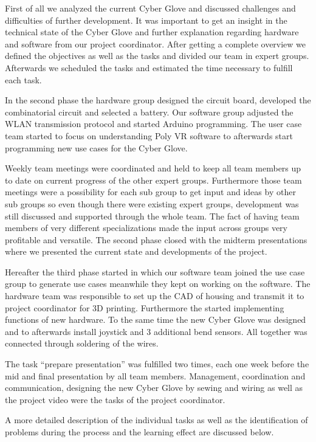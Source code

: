 First of all we analyzed the current Cyber Glove and discussed challenges and difficulties of further development. It was important to get an insight in the technical state of the Cyber Glove and further explanation regarding hardware and software from our project coordinator. After getting a complete overview we defined the objectives as well as the tasks and divided our team in expert groups. Afterwards we scheduled the tasks and estimated the time necessary to fulfill each task.

In the second phase the hardware group designed the circuit board, developed the combinatorial circuit and selected a battery. Our software group adjusted the WLAN transmission protocol and started Arduino programming. The user case team started to focus on understanding Poly VR software to afterwards start programming new use cases for the Cyber Glove. 

Weekly team meetings were coordinated and held to keep all team members up to date on current progress of the other expert groups. Furthermore those team meetings were a possibility for each sub group to get input and ideas by other sub groups so even though there were existing expert groups, development was still discussed and supported through the whole team. The fact of having team members of very different specializations made the input across groups very profitable and versatile. The second phase closed with the midterm presentations where we presented the current state and developments of the project.

Hereafter the third phase started in which our software team joined the use case group to generate use cases meanwhile they kept on working on the software. The hardware team was responsible to set up the CAD of housing and transmit it to project coordinator for 3D printing. Furthermore the started implementing functions of new hardware. To the same time the new Cyber Glove was designed and to afterwards install joystick and 3 additional bend sensors. All together was connected through soldering of the wires.

The task “prepare presentation” was fulfilled two times, each one week before the mid and final presentation by all team members. Management, coordination and communication, designing the new Cyber Glove by sewing and wiring as well as the project video were the tasks of the project coordinator.

A more detailed description of the individual tasks as well as the identification of problems during the process and the learning effect are discussed below.



